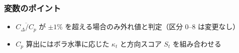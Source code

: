 \subsubsection*{変数のポイント}
\begin{flushleft}
\begin{itemize}
  \item \(\overline{C_\Delta/C_p}\) が \(\pm1\%\) を超える場合のみ外れ値と判定（区分 0--8 は変更なし）
  \item $C_p$ 算出にはボラ水準に応じた \(\kappa_t\) と方向スコア $S_t$ を組み合わせる
\end{itemize}
\end{flushleft}

\bigskip

